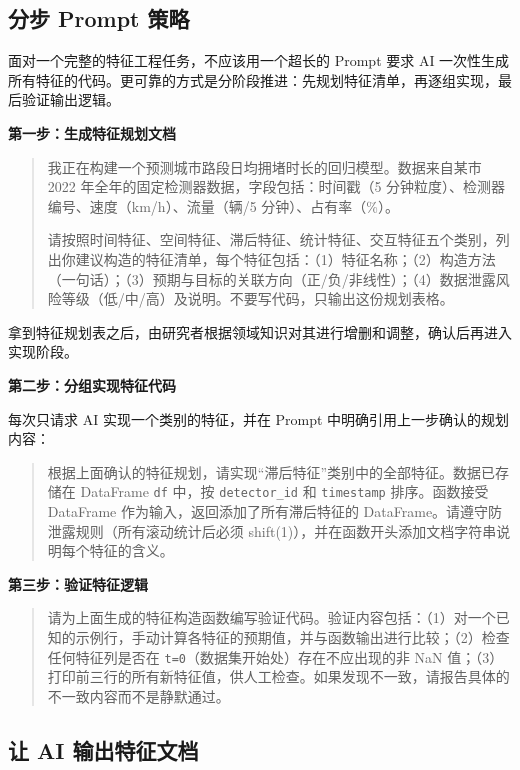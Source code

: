 \subsection{分步 Prompt 策略}

面对一个完整的特征工程任务，不应该用一个超长的 Prompt 要求 AI 一次性生成所有特征的代码。更可靠的方式是分阶段推进：先规划特征清单，再逐组实现，最后验证输出逻辑。

\textbf{第一步：生成特征规划文档}

\begin{quote}
我正在构建一个预测城市路段日均拥堵时长的回归模型。数据来自某市 2022 年全年的固定检测器数据，字段包括：时间戳（5 分钟粒度）、检测器编号、速度（km/h）、流量（辆/5 分钟）、占有率（\%）。

请按照时间特征、空间特征、滞后特征、统计特征、交互特征五个类别，列出你建议构造的特征清单，每个特征包括：（1）特征名称；（2）构造方法（一句话）；（3）预期与目标的关联方向（正/负/非线性）；（4）数据泄露风险等级（低/中/高）及说明。不要写代码，只输出这份规划表格。
\end{quote}

拿到特征规划表之后，由研究者根据领域知识对其进行增删和调整，确认后再进入实现阶段。

\textbf{第二步：分组实现特征代码}

每次只请求 AI 实现一个类别的特征，并在 Prompt 中明确引用上一步确认的规划内容：

\begin{quote}
根据上面确认的特征规划，请实现“滞后特征”类别中的全部特征。数据已存储在 DataFrame \texttt{df} 中，按 \texttt{detector\_id} 和 \texttt{timestamp} 排序。函数接受 DataFrame 作为输入，返回添加了所有滞后特征的 DataFrame。请遵守防泄露规则（所有滚动统计后必须 shift(1)），并在函数开头添加文档字符串说明每个特征的含义。
\end{quote}

\textbf{第三步：验证特征逻辑}

\begin{quote}
请为上面生成的特征构造函数编写验证代码。验证内容包括：（1）对一个已知的示例行，手动计算各特征的预期值，并与函数输出进行比较；（2）检查任何特征列是否在 \texttt{t=0}（数据集开始处）存在不应出现的非 NaN 值；（3）打印前三行的所有新特征值，供人工检查。如果发现不一致，请报告具体的不一致内容而不是静默通过。
\end{quote}

\subsection{让 AI 输出特征文档}

